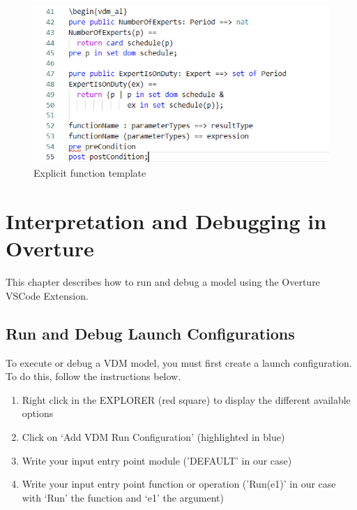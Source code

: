 \documentclass{overturerepchap}
\begin{document}
\begin{figure}
\begin{center}
\includegraphics[width=6in]{snapshots/Explicit function template.png}
\caption{Explicit function template}
\label{fig:functionTemplate}
\end{center}
\end{figure}



\chapter{Interpretation and Debugging in Overture}\label{sec:debug}

This chapter describes how to run and debug a model using the Overture VSCode Extension.

\section{Run and Debug Launch Configurations}\label{sec:launchmodes}

To execute or debug a VDM model, you must first create a launch
configuration. To do this, follow the instructions below. 


\begin{enumerate}
    \item Right click in the EXPLORER (red square) to display the different available options
    \item Click on ‘Add VDM Run Configuration’ (highlighted in blue)
    \item  Write your input entry point module ('DEFAULT' in our case)
    \item Write your input entry point function or operation ('Run(e1)' in our case with ‘Run’ the function and ‘e1’ the argument)
\end{enumerate}
\end{document}
